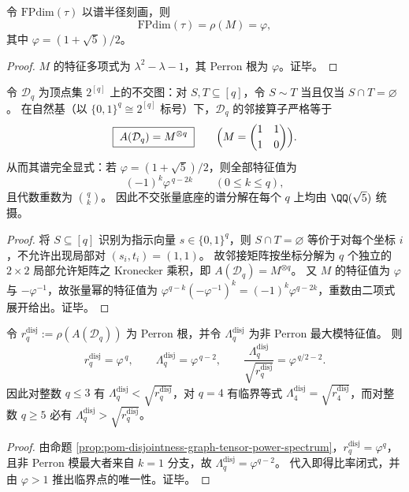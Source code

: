 \begin{corollary}\label{cor:pom-centralizer-fpdim-golden}
令 \(\mathrm{FPdim}(\tau)\) 以谱半径刻画，则
\[
\mathrm{FPdim}(\tau)=\rho(M)=\varphi,
\]
其中 \(\varphi=(1+\sqrt5)/2\)。
\end{corollary}
\begin{proof}
\(M\) 的特征多项式为 \(\lambda^2-\lambda-1\)，其 Perron 根为 \(\varphi\)。证毕。
\end{proof}



\begin{proposition}\label{prop:pom-disjointness-graph-tensor-power-spectrum}
令 \(\mathcal{D}_q\) 为顶点集 \(2^{[q]}\) 上的不交图：对 \(S,T\subseteq[q]\)，令 \(S\sim T\) 当且仅当 \(S\cap T=\varnothing\)。
在自然基（以 \(\{0,1\}^q\cong 2^{[q]}\) 标号）下，\(\mathcal{D}_q\) 的邻接算子严格等于
\[
\boxed{\;A(\mathcal{D}_q)=M^{\otimes q}\;}
\qquad\Bigl(M=\begin{pmatrix}1&1\\[2pt]1&0\end{pmatrix}\Bigr).
\]
从而其谱完全显式：若 \(\varphi=(1+\sqrt5)/2\)，则全部特征值为
\[
(-1)^k\varphi^{\,q-2k}\qquad(0\le k\le q),
\]
且代数重数为 \(\binom{q}{k}\)。
因此不交张量底座的谱分解在每个 \(q\) 上均由 \(\QQ(\sqrt5)\) 统摄。
\end{proposition}
\begin{proof}
将 \(S\subseteq[q]\) 识别为指示向量 \(s\in\{0,1\}^q\)，则 \(S\cap T=\varnothing\) 等价于对每个坐标 \(i\)，不允许出现局部对 \((s_i,t_i)=(1,1)\)。
故邻接矩阵按坐标分解为 \(q\) 个独立的 \(2\times 2\) 局部允许矩阵之 Kronecker 乘积，即 \(A(\mathcal{D}_q)=M^{\otimes q}\)。
又 \(M\) 的特征值为 \(\varphi\) 与 \(-\varphi^{-1}\)，故张量幂的特征值为 \(\varphi^{q-k}(-\varphi^{-1})^k=(-1)^k\varphi^{q-2k}\)，重数由二项式展开给出。证毕。
\end{proof}

\begin{corollary}[\texorpdfstring{$q=4$}{q=4} 为不交图层面 Ramanujan 比率的唯一整数临界点]\label{cor:pom-disjointness-ramanujan-q4-critical}
令 \(r_q^{\mathrm{disj}}:=\rho(A(\mathcal{D}_q))\) 为 Perron 根，并令 \(\Lambda_q^{\mathrm{disj}}\) 为非 Perron 最大模特征值。
则
\[
r_q^{\mathrm{disj}}=\varphi^{\,q},\qquad \Lambda_q^{\mathrm{disj}}=\varphi^{\,q-2},\qquad
\frac{\Lambda_q^{\mathrm{disj}}}{\sqrt{r_q^{\mathrm{disj}}}}=\varphi^{\,q/2-2}.
\]
因此对整数 \(q\le 3\) 有 \(\Lambda_q^{\mathrm{disj}}<\sqrt{r_q^{\mathrm{disj}}}\)，对 \(q=4\) 有临界等式 \(\Lambda_4^{\mathrm{disj}}=\sqrt{r_4^{\mathrm{disj}}}\)，而对整数 \(q\ge 5\) 必有 \(\Lambda_q^{\mathrm{disj}}>\sqrt{r_q^{\mathrm{disj}}}\)。
\end{corollary}
\begin{proof}
由命题 \ref{prop:pom-disjointness-graph-tensor-power-spectrum}，\(r_q^{\mathrm{disj}}=\varphi^q\)，且非 Perron 模最大者来自 \(k=1\) 分支，故 \(\Lambda_q^{\mathrm{disj}}=\varphi^{q-2}\)。
代入即得比率闭式，并由 \(\varphi>1\) 推出临界点的唯一性。证毕。
\end{proof}

